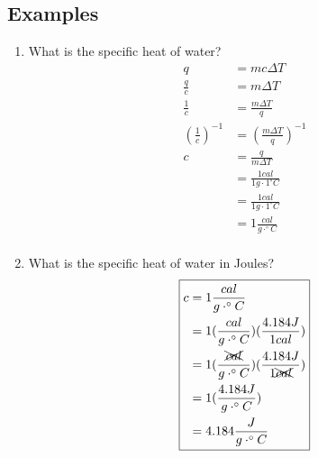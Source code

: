 \documentclass[11pt, oneside]{article}   	%
\begin{document}
\subsection{Examples}
\begin{enumerate}[label=Example \arabic*]
\item What is the specific heat of water?
\begin{equation} 
\boxed{
\begin{split}
    q &= m c \Delta T  \\
    \frac{q}{c} &= m \Delta T \\
    \frac{1}{c} &= \frac{m \Delta T}{q} \\
    (\frac{1}{c}) ^{-1} &= (\frac{m \Delta T}{q})^{-1} \\
    c &= \frac{q}{m \Delta T} \\    
       &= \frac{1 cal} {1g \cdot 1^{\circ} C} \\
       &= \frac{1 cal} {1g \cdot 1^{\circ} C} \\
       &= 1 \frac{cal} {g \cdot ^{\circ} C} \\
 \end{split}
 }
 \end{equation}
 \item What is the specific heat of water in Joules?
\begin{equation} 
\boxed{
\begin{split}
      c &= 1 \frac{cal} {g \cdot ^{\circ} C} \\
         &= 1 (\frac{cal} {g \cdot ^{\circ} C})(\frac{4.184 J}{1 cal})\\
         &= 1 (\frac{\xcancel{cal}} {g \cdot ^{\circ} C})(\frac{4.184 J}{1 \xcancel{cal}})\\
         &= 1 (\frac{4.184 J} {g \cdot ^{\circ} C})\\ 
         &= 4.184 \frac{ J} {g \cdot ^{\circ} C}\\     
 \end{split}
 }
 \end{equation}

 \end{enumerate}




\nocite{wile-chem-2}
{}

\end{document}
